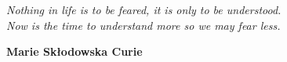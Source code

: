 \documentclass[a4paper,11pt,twoside,openright]{report}
\begin{document}




\cleardoublepage



\setcounter{page}{6}


\cleardoublepage


\vspace*{15cm}

\begin{flushright}
    \textit{Nothing in life is to be feared, it is only to be understood.\\Now is the time to understand more so we may fear less.}
    
    \textbf{Marie Skłodowska Curie}
\end{flushright}


\cleardoublepage


\cleardoublepage


\cleardoublepage

\tableofcontents

\cleardoublepage
\setcounter{page}{1}
















\thispagestyle{empty}

\cleardoublepage





\end{document}
